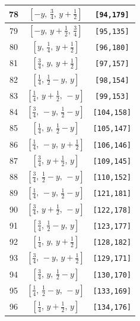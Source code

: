 \documentclass[fleqn,8pt]{jsarticle}
\begin{document}
\begin{longtable}{ccc}
78 & $\left[ - y,\, \frac{3}{4},\, y + \frac{1}{2} \right]$ & {\tt [94,179]} \\ \hline
79 & $\left[ - y,\, y + \frac{1}{2},\, \frac{3}{4} \right]$ & {\tt [95,135]} \\ \hline
80 & $\left[ y,\, \frac{1}{4},\, y + \frac{1}{2} \right]$ & {\tt [96,180]} \\ \hline
81 & $\left[ \frac{3}{4},\, y,\, y + \frac{1}{2} \right]$ & {\tt [97,157]} \\ \hline
82 & $\left[ \frac{1}{4},\, \frac{1}{2} - y,\, y \right]$ & {\tt [98,154]} \\ \hline
83 & $\left[ \frac{1}{4},\, y + \frac{1}{2},\, - y \right]$ & {\tt [99,153]} \\ \hline
84 & $\left[ \frac{3}{4},\, - y,\, \frac{1}{2} - y \right]$ & {\tt [104,158]} \\ \hline
85 & $\left[ \frac{1}{4},\, y,\, \frac{1}{2} - y \right]$ & {\tt [105,147]} \\ \hline
86 & $\left[ \frac{1}{4},\, - y,\, y + \frac{1}{2} \right]$ & {\tt [106,146]} \\ \hline
87 & $\left[ \frac{3}{4},\, y + \frac{1}{2},\, y \right]$ & {\tt [109,145]} \\ \hline
88 & $\left[ \frac{3}{4},\, \frac{1}{2} - y,\, - y \right]$ & {\tt [110,152]} \\ \hline
89 & $\left[ \frac{1}{4},\, - y,\, \frac{1}{2} - y \right]$ & {\tt [121,181]} \\ \hline
90 & $\left[ \frac{3}{4},\, y + \frac{1}{2},\, - y \right]$ & {\tt [122,178]} \\ \hline
91 & $\left[ \frac{3}{4},\, \frac{1}{2} - y,\, y \right]$ & {\tt [123,177]} \\ \hline
92 & $\left[ \frac{1}{4},\, y,\, y + \frac{1}{2} \right]$ & {\tt [128,182]} \\ \hline
93 & $\left[ \frac{3}{4},\, - y,\, y + \frac{1}{2} \right]$ & {\tt [129,171]} \\ \hline
94 & $\left[ \frac{3}{4},\, y,\, \frac{1}{2} - y \right]$ & {\tt [130,170]} \\ \hline
95 & $\left[ \frac{1}{4},\, \frac{1}{2} - y,\, - y \right]$ & {\tt [133,169]} \\ \hline
96 & $\left[ \frac{1}{4},\, y + \frac{1}{2},\, y \right]$ & {\tt [134,176]} \\
\end{longtable}
\renewcommand{\arraystretch}{1.2}
\end{document}
